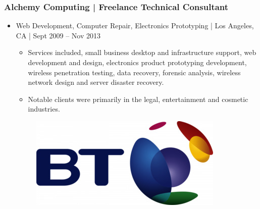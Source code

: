 \documentclass[letter,10pt]{article}
\begin{document}
\subsubsection*{Alchemy Computing | Freelance Technical Consultant}
\label{sec:orgef829dc}
\begin{itemize}
\item Web Development, Computer Repair, Electronics Prototyping | Los Angeles, CA | Sept 2009 – Nov 2013
\label{sec:org51db5e4}
\begin{itemize}
\item Services included, small business desktop and infrastructure support, web development and design, electronics product prototyping development, wireless penetration testing, data recovery, forensic analysis, wireless network design and server disaster recovery.
\item Notable clients were primarily in the legal, entertainment and cosmetic industries.
\end{itemize}



\begin{figure}
\includegraphics[width=0.8\linewidth]{./img/50p_cr_bt.jpg}
\end{figure}
\end{itemize}
\end{document}
